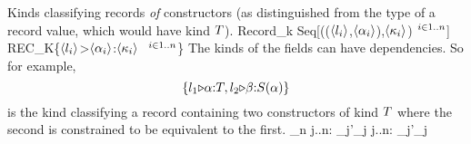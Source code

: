 \documentclass[12pt,twoside,fleqn]{article}
\begin{document}
  {Kinds classifying records \textit{of} constructors (as
   distinguished from the type of a record value, which would have kind 
   $T$).}
  {}
  {Record\_k Seq[(($\langle{l_i}\rangle$,$\langle{\alpha_i}\rangle$),$\langle{\kappa_i}\rangle$)$\ {}^{i\in 1..n}$]}
  {REC\_K\{$\langle{l_i}\rangle$>$\langle{\alpha_i}\rangle$:$\langle{\kappa_i}\rangle$
           $\ {}^{i\in 1..n}$\}} 
  {The kinds of the fields can have dependencies.  So for example,
   \[\{{l_1{\triangleright}{\alpha}{:}{T},
              l_2{\triangleright}{\beta}{:}
                  {S(\alpha)}}\}\]
   is the kind classifying a record containing two constructors
   of kind $T$ where the second is constrained to be equivalent
   to the first.}
  {
    \irule
    {\validcontext{\context}\quad
                 {\kind_n}}
    {\validkind{\context}
       {}}
    \irule
     {\forall j..n:\quad
                 {\kind_j}{\kind'_j}}
     {\equivkind{\context}
        {}
        {}}
    \irule
     {\forall j..n:\quad
                 {\kind_j}{\kind'_j}}
     {\subkind{\context}
        {}
        {}}
   }

\newcommand{\kpimil}[3]{\Pi^{#1}(#2).#3}
\end{document}
